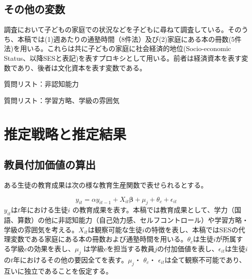 \documentclass[a4paper,12pt]{article}
\begin{document}
\subsection*{その他の変数}
調査において子どもの家庭での状況などを子どもに尋ねて調査している。そのうち、本稿では(1)週あたりの通塾時間（8件法）及び(2)家庭にある本の冊数(5件法)を用いる。これらは共に子どもの家庭に社会経済的地位(Socio-economic Status、以降SESと表記)を表すプロキシとして用いる。前者は経済資本を表す変数であり、後者は文化資本を表す変数である。

\begin{landscape}
\begin{table}[htbp]
\begin{adjustbox}{max width=1.5\textwidth}

\end{adjustbox}
\caption{質問リスト：非認知能力}
\label{table:item}
\end{table}
\end{landscape}


\begin{landscape}
\begin{table}[htbp]
\begin{adjustbox}{max width=1.5\textwidth}

\end{adjustbox}
\caption{質問リスト：学習方略、学級の雰囲気}
\label{table:item2}
\end{table}
\end{landscape}

\section{推定戦略と推定結果\label{results}}
\subsection{教員付加価値の算出\label{methodology}}
ある生徒の教育成果は次の様な教育生産関数で表せられるとする。

 \begin{equation}
 \label{basic}
  y_{it} = \alpha y_{it-1} +  X_{it} \boldsymbol{\beta} +  \mu_j + \theta_{c} + \epsilon_{it}
 \end{equation}
$ y_{it}$は$t$年における生徒$i$ の教育成果を表す。本稿では教育成果として、学力（国語、算数）の他に非認知能力（自己効力感、セルフコントロール）や学習方略・学級の雰囲気を考える。$X_{it} $は観察可能な生徒$i$の特徴を表し、本稿ではSESの代理変数である家庭にある本の冊数および通塾時間を用いる。$\theta_{c} $は生徒$i$が所属する学級$c$の効果を表し、$\mu_j$ は学級$c$を担当する教員$j$の付加価値を表し、$\epsilon_{it}$は生徒$i$の$t$年におけるその他の要因全てを表す。$\mu_j$・  $\theta_{c}$・ $\epsilon_{it}$は全て観察不可能であり、互いに独立であることを仮定する。
\end{document}
